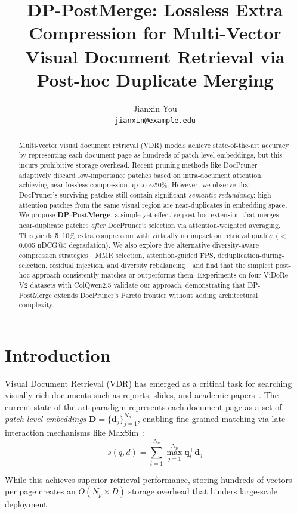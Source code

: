 \documentclass[11pt]{article}
\title{DP-PostMerge: Lossless Extra Compression for Multi-Vector\\Visual Document Retrieval via Post-hoc Duplicate Merging}
\author{
  Jianxin You \\
  \texttt{jianxin@example.edu}
}
\begin{document}
\maketitle

\begin{abstract}
Multi-vector visual document retrieval (VDR) models achieve state-of-the-art accuracy by representing each document page as hundreds of patch-level embeddings, but this incurs prohibitive storage overhead.
Recent pruning methods like DocPruner adaptively discard low-importance patches based on intra-document attention, achieving near-lossless compression up to $\sim$50\%.
However, we observe that DocPruner's surviving patches still contain significant \emph{semantic redundancy}: high-attention patches from the same visual region are near-duplicates in embedding space.
We propose \textbf{DP-PostMerge}, a simple yet effective post-hoc extension that merges near-duplicate patches \emph{after} DocPruner's selection via attention-weighted averaging.
This yields 5--10\% extra compression with virtually no impact on retrieval quality ($<$0.005 nDCG@5 degradation).
We also explore five alternative diversity-aware compression strategies---MMR selection, attention-guided FPS, deduplication-during-selection, residual injection, and diversity rebalancing---and find that the simplest post-hoc approach consistently matches or outperforms them.
Experiments on four ViDoRe-V2 datasets with ColQwen2.5 validate our approach, demonstrating that DP-PostMerge extends DocPruner's Pareto frontier without adding architectural complexity.
\end{abstract}


\section{Introduction}

Visual Document Retrieval (VDR) has emerged as a critical task for searching visually rich documents such as reports, slides, and academic papers~\cite{faysse2024colpali}.
The current state-of-the-art paradigm represents each document page as a set of \emph{patch-level embeddings} $\mathbf{D} = \{\mathbf{d}_j\}_{j=1}^{N_p}$, enabling fine-grained matching via late interaction mechanisms like MaxSim~\cite{khattab2020colbert}:
\begin{equation}
s(q, d) = \sum_{i=1}^{N_q} \max_{j=1}^{N_p} \mathbf{q}_i^\top \mathbf{d}_j
\end{equation}

While this achieves superior retrieval performance, storing hundreds of vectors per page creates an $O(N_p \times D)$ storage overhead that hinders large-scale deployment~\cite{santhanam2022plaid}.
\end{document}
